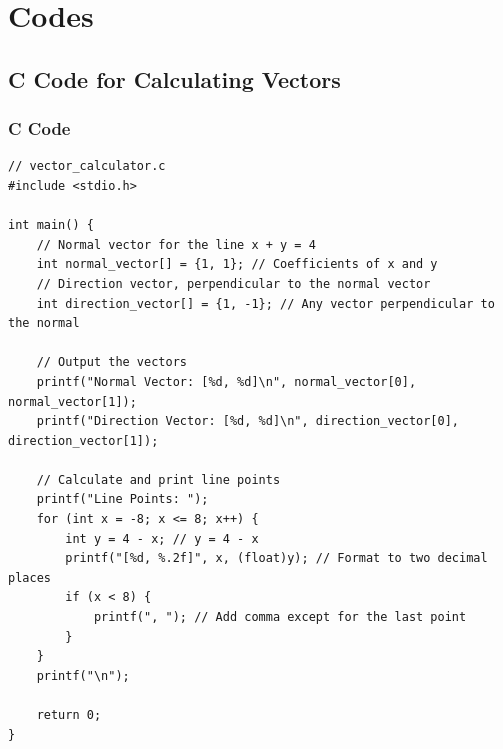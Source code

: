 \documentclass{beamer}
\begin{document}
\section{Codes}
\subsection{C Code for Calculating Vectors}

\begin{frame}[fragile]
\frametitle{C Code}
\lstset{basicstyle=\tiny\ttfamily, breaklines=true}
\begin{lstlisting}
// vector_calculator.c
#include <stdio.h>

int main() {
    // Normal vector for the line x + y = 4
    int normal_vector[] = {1, 1}; // Coefficients of x and y
    // Direction vector, perpendicular to the normal vector
    int direction_vector[] = {1, -1}; // Any vector perpendicular to the normal

    // Output the vectors
    printf("Normal Vector: [%d, %d]\n", normal_vector[0], normal_vector[1]);
    printf("Direction Vector: [%d, %d]\n", direction_vector[0], direction_vector[1]);

    // Calculate and print line points
    printf("Line Points: ");
    for (int x = -8; x <= 8; x++) {
        int y = 4 - x; // y = 4 - x
        printf("[%d, %.2f]", x, (float)y); // Format to two decimal places
        if (x < 8) {
            printf(", "); // Add comma except for the last point
        }
    }
    printf("\n");

    return 0;
}
\end{lstlisting}
\end{frame}
\end{document}
